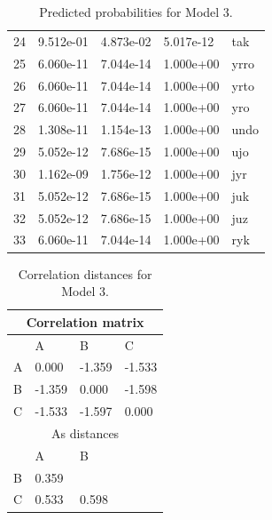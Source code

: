 \begin{table}[!htpb]
\begin{tabular}{lllll}
    24 & 9.512e-01     & 4.873e-02     & 5.017e-12     & tak  \\
    25 & 6.060e-11     & 7.044e-14     & 1.000e+00     & yrro \\
    26 & 6.060e-11     & 7.044e-14     & 1.000e+00     & yrto \\
    27 & 6.060e-11     & 7.044e-14     & 1.000e+00     & yro  \\
    28 & 1.308e-11     & 1.154e-13     & 1.000e+00     & undo \\
    29 & 5.052e-12     & 7.686e-15     & 1.000e+00     & ujo  \\
    30 & 1.162e-09     & 1.756e-12     & 1.000e+00     & jyr  \\
    31 & 5.052e-12     & 7.686e-15     & 1.000e+00     & juk  \\
    32 & 5.052e-12     & 7.686e-15     & 1.000e+00     & juz  \\
    33 & 6.060e-11     & 7.044e-14     & 1.000e+00     & ryk  \\
    \bottomrule
  \end{tabular}
  \caption{Predicted probabilities for Model 3.}\label{tab:probabilities-model3}
\end{table}

\begin{table}[!htpb]
  \centering
  \begin{tabular}{llll}
    \toprule
    \multicolumn{4}{c}{Correlation matrix} \\
    \midrule
      & A      & B      & C                \\
    \midrule
    A & 0.000  & -1.359 & -1.533           \\
    B & -1.359 & 0.000  & -1.598           \\
    C & -1.533 & -1.597 & 0.000            \\
    \midrule
    \multicolumn{4}{c}{As distances}       \\
      & A      & B                         \\
    \midrule
    B & 0.359  &                           \\
    C & 0.533  & 0.598                     \\
    \bottomrule
  \end{tabular}
  \caption{Correlation distances for Model 3.}\label{tab:corr-dist-model3}
\end{table}

